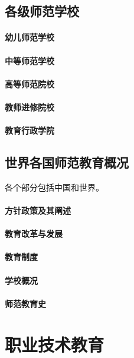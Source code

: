 \documentclass[UTF8]{../../ApplicationUniverse}
\begin{document}
\section{各级师范学校}
    \subsubsection{幼儿师范学校}
    \subsubsection{中等师范学校}
    \subsubsection{高等师范院校}
    \subsubsection{教师进修院校}
    \subsubsection{教育行政学院}
\section{世界各国师范教育概况}
各个部分包括中国和世界。
    \subsubsection{方针政策及其阐述}
    \subsubsection{教育改革与发展}
    \subsubsection{教育制度}
    \subsubsection{学校概况}
    \subsubsection{师范教育史}
    









\chapter{职业技术教育}
\end{document}
